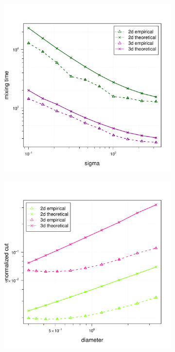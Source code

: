 \documentclass{article}
\newcommand{\1}{\mathbf{1}}
\theoremstyle{aldenthm}
\theoremstyle{aldenrmrk}
\begin{document}
\begin{figure}
\begin{adjustbox}{minipage=\linewidth,scale=0.8}
	
	\begin{subfigure}{.33\linewidth}
		\includegraphics[width=\linewidth]{example1plots/sigma_mixing_time_plot}
		\caption{}
	\end{subfigure}
	\begin{subfigure}{.33\linewidth}
		\includegraphics[width=\linewidth]{example1plots/diameter_normalized_cut_plot}

\end{subfigure}
\end{adjustbox}
\end{figure}
\end{document}
